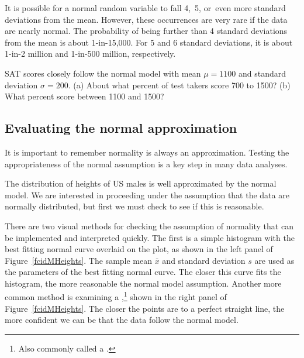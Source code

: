 It is possible for a normal random variable to fall 4,~5, or~even more standard deviations from the mean. However, these occurrences are very rare if the data are nearly normal. The probability of being further than 4 standard deviations from the mean is about 1-in-15,000. For 5 and 6 standard deviations, it is about 1-in-2 million and 1-in-500 million, respectively.

\begin{exercisewrap}
\begin{nexercise}
SAT scores closely follow the normal model with mean $\mu = 1100$ and standard deviation $\sigma = 200$. (a) About what percent of test takers score 700 to 1500? (b) What percent score between 1100 and 1500?\footnotemark
\end{nexercise}
\end{exercisewrap}


\D{\newpage}

\subsection{Evaluating the normal approximation}
\label{assessingNormal}

It is important to remember normality is always an approximation. Testing the appropriateness of the normal assumption is a key step in many data analyses.


The distribution of heights of US males is well approximated by the normal model. We are interested in proceeding under the assumption that the data are normally distributed, but first we must check to see if this is reasonable.

There are two visual methods for checking the assumption of normality that can be implemented and interpreted quickly. The first is a simple histogram with the best fitting normal curve overlaid on the plot, as shown in the left panel of Figure~\ref{fcidMHeights}. The sample mean $\bar{x}$ and standard deviation $s$ are used as the parameters of the best fitting normal curve. The closer this curve fits the histogram, the more reasonable the normal model assumption. Another more common method is examining a ,\footnote{Also commonly called a .} shown in the right panel of Figure~\ref{fcidMHeights}. The closer the points are to a perfect straight line, the more confident we can be that the data follow the normal model.

